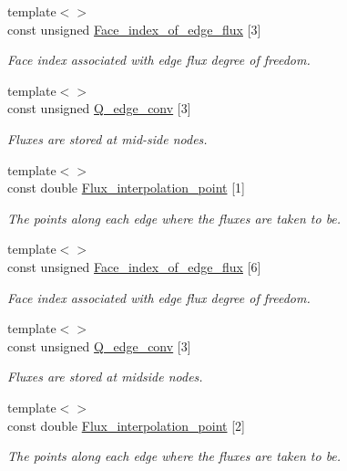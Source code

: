 \begin{DoxyCompactItemize}
\item 
{\footnotesize template$<$$>$ }\\const unsigned \hyperlink{classoomph_1_1TRaviartThomasDarcyElement_ac9220c8f75234912ecebc76e95da7740}{Face\+\_\+index\+\_\+of\+\_\+edge\+\_\+flux} \mbox{[}3\mbox{]}
\begin{DoxyCompactList}\small\item\em Face index associated with edge flux degree of freedom. \end{DoxyCompactList}\item 
{\footnotesize template$<$$>$ }\\const unsigned \hyperlink{classoomph_1_1TRaviartThomasDarcyElement_a6c9a1ccd1e7121919df4ceb07c092c88}{Q\+\_\+edge\+\_\+conv} \mbox{[}3\mbox{]}
\begin{DoxyCompactList}\small\item\em Fluxes are stored at mid-\/side nodes. \end{DoxyCompactList}\item 
{\footnotesize template$<$$>$ }\\const double \hyperlink{classoomph_1_1TRaviartThomasDarcyElement_a3f02285e31cb174243039d51e4541a15}{Flux\+\_\+interpolation\+\_\+point} \mbox{[}1\mbox{]}
\begin{DoxyCompactList}\small\item\em The points along each edge where the fluxes are taken to be. \end{DoxyCompactList}\item 
{\footnotesize template$<$$>$ }\\const unsigned \hyperlink{classoomph_1_1TRaviartThomasDarcyElement_aba5bc5f57d1a57548c272f123b4843e8}{Face\+\_\+index\+\_\+of\+\_\+edge\+\_\+flux} \mbox{[}6\mbox{]}
\begin{DoxyCompactList}\small\item\em Face index associated with edge flux degree of freedom. \end{DoxyCompactList}\item 
{\footnotesize template$<$$>$ }\\const unsigned \hyperlink{classoomph_1_1TRaviartThomasDarcyElement_ab72633b1d637a12ff2986ff26ae75bd2}{Q\+\_\+edge\+\_\+conv} \mbox{[}3\mbox{]}
\begin{DoxyCompactList}\small\item\em Fluxes are stored at midside nodes. \end{DoxyCompactList}\item 
{\footnotesize template$<$$>$ }\\const double \hyperlink{classoomph_1_1TRaviartThomasDarcyElement_adf14750f8c74e32cbd864abce01911e5}{Flux\+\_\+interpolation\+\_\+point} \mbox{[}2\mbox{]}
\begin{DoxyCompactList}\small\item\em The points along each edge where the fluxes are taken to be. \end{DoxyCompactList}\end{DoxyCompactItemize}

